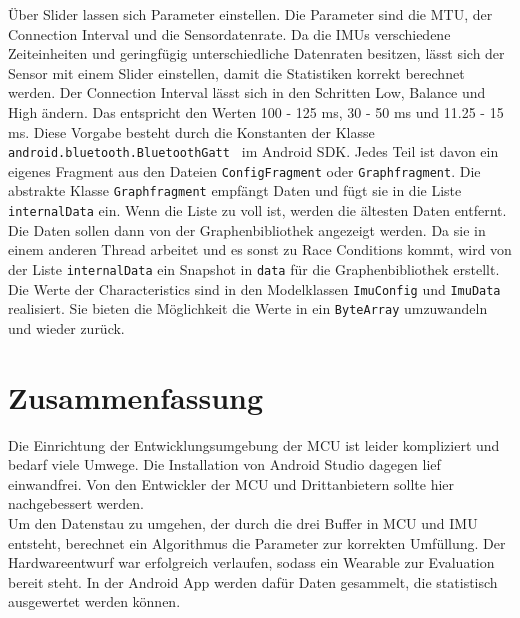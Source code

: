 Über Slider lassen sich Parameter einstellen.
Die Parameter sind die MTU, der Connection Interval und die Sensordatenrate.
Da die IMUs verschiedene Zeiteinheiten und geringfügig unterschiedliche Datenraten besitzen, lässt sich der Sensor mit einem Slider einstellen, damit die Statistiken korrekt berechnet werden.
Der Connection Interval lässt sich in den Schritten Low, Balance und High ändern.
Das entspricht den Werten 100 - 125 ms, 30 - 50 ms und 11.25 - 15 ms.
Diese Vorgabe besteht durch die Konstanten der Klasse \texttt{android.bluetooth.BluetoothGatt
} im Android SDK.
Jedes Teil ist davon ein eigenes Fragment aus den Dateien \texttt{ConfigFragment} oder \texttt{Graphfragment}.
Die abstrakte Klasse \texttt{Graphfragment} empfängt Daten und fügt sie in die Liste \texttt{internalData} ein.
Wenn die Liste zu voll ist, werden die ältesten Daten entfernt.
Die Daten sollen dann von der Graphenbibliothek angezeigt werden.
Da sie in einem anderen Thread arbeitet und es sonst zu Race Conditions kommt, wird von der Liste \texttt{internalData} ein Snapshot in \texttt{data} für die Graphenbibliothek erstellt.\\
Die Werte der Characteristics sind in den Modelklassen \texttt{ImuConfig} und \texttt{ImuData} realisiert.
Sie bieten die Möglichkeit die Werte in ein \texttt{ByteArray} umzuwandeln und wieder zurück.

\section{Zusammenfassung}
Die Einrichtung der Entwicklungsumgebung der MCU ist leider kompliziert und bedarf viele Umwege.
Die Installation von Android Studio dagegen lief einwandfrei.
Von den Entwickler der MCU und Drittanbietern sollte hier nachgebessert werden.\\
Um den Datenstau zu umgehen, der durch die drei Buffer in MCU und IMU entsteht, berechnet ein Algorithmus die Parameter zur korrekten Umfüllung.
Der Hardwareentwurf war erfolgreich verlaufen, sodass ein Wearable zur Evaluation bereit steht.
In der Android App werden dafür Daten gesammelt, die statistisch ausgewertet werden können.
